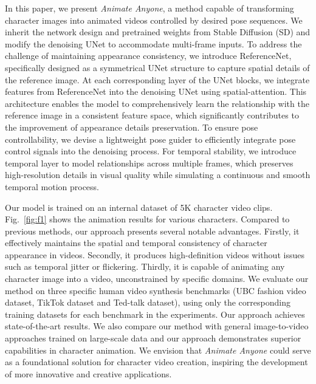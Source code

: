 In this paper, we present \textit{Animate Anyone}, a method capable of transforming character images into animated videos controlled by desired pose sequences. 
We inherit the network design and pretrained weights from Stable Diffusion (SD) and modify the denoising UNet\cite{unet} to accommodate multi-frame inputs.
To address the challenge of maintaining appearance consistency, we introduce ReferenceNet, specifically designed as a symmetrical UNet structure to capture spatial details of the reference image. At each corresponding layer of the UNet blocks, we integrate features from ReferenceNet into the denoising UNet using spatial-attention\cite{attention}. This architecture enables the model to comprehensively learn the relationship with the reference image in a consistent feature space, which significantly contributes to the improvement of appearance details preservation. 
To ensure pose controllability, we devise a lightweight pose guider to efficiently integrate pose control signals into the denoising process. 
For temporal stability, we introduce temporal layer to model relationships across multiple frames, which preserves high-resolution details in visual quality while simulating a continuous and smooth temporal motion process.

Our model is trained on an internal dataset of 5K character video clips. Fig.~\ref{fig:f1} shows the animation results for various characters. Compared to previous methods, our approach presents several notable advantages. 
Firstly, it effectively maintains the spatial and temporal consistency of character appearance in videos. Secondly, it produces high-definition videos without issues such as temporal jitter or flickering. Thirdly, it is capable of animating any character image into a video, unconstrained by specific domains. 
We evaluate our method on three specific human video synthesis benchmarks (UBC fashion video dataset\cite{dwnet}, TikTok dataset\cite{tiktok} and Ted-talk dataset\cite{mraa}), using only the corresponding training datasets for each benchmark in the experiments. Our approach achieves state-of-the-art results.
We also compare our method with general image-to-video approaches trained on large-scale data and our approach demonstrates superior capabilities in character animation. 
We envision that \textit{Animate Anyone} could serve as a foundational solution for character video creation, inspiring the development of more innovative and creative applications.

